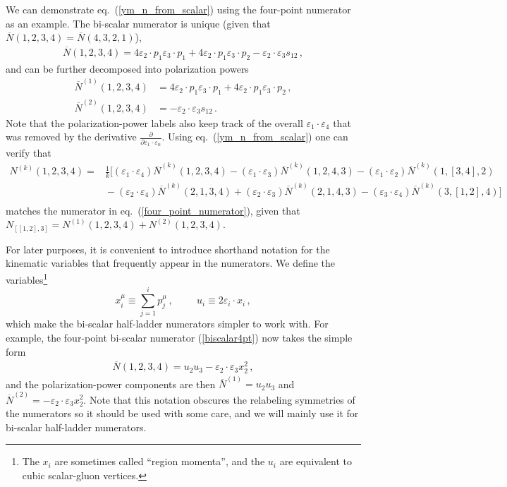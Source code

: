 \documentclass[11pt,a4paper]{article}
\newcommand{\z}{x}
\def\eqn#1{eq.~(\ref{#1})}
\begin{document}
We can demonstrate \eqn{ym_n_from_scalar} using the four-point numerator as an example. The bi-scalar numerator is unique (given that $\overline{N}(1,2,3,4)=\overline{N}(4,3,2,1)$),
%
\begin{eqnarray} \label{biscalar4pt}
\overline{N}(1,2,3,4) = 
4 \varepsilon_2{\cdot} p_1 \varepsilon_3 {\cdot} p_1 + 4 \varepsilon_2{\cdot} p_1 \varepsilon_3 {\cdot} p_2 - 
 \varepsilon_2 {\cdot} \varepsilon_3 s_{12} \, ,
\end{eqnarray}
and can be further decomposed into polarization powers
\begin{align}
\overline{N}^{(1)}(1,2,3,4) &= 
4 \varepsilon_2{\cdot} p_1 \varepsilon_3 {\cdot} p_1 + 4 \varepsilon_2{\cdot} p_1 \varepsilon_3 {\cdot} p_2  \,, \nonumber \\
 \overline{N}^{(2)}(1,2,3,4)& = - 
 \varepsilon_2 {\cdot} \varepsilon_3 s_{12} \, .
\end{align}
Note that the polarization-power labels also keep track of the overall $\varepsilon_1 {\cdot} \varepsilon_4$ that was removed by the derivative $\frac{\partial}{\partial\varepsilon_1{\cdot}\varepsilon_n}$.
Using \eqn{ym_n_from_scalar} one can verify that 
\begin{align}
    N^{(k)}(1,2,3,4)
    =& \frac{1}{k}\Big[(\varepsilon_1{\cdot}\varepsilon_4) {\overline N}^{(k)}(1,2,3,4) -(\varepsilon_1{\cdot}\varepsilon_3) {\overline N}^{(k)}(1,2,4,3)-(\varepsilon_1{\cdot}\varepsilon_2) {\overline N}^{(k)}(1,[3,4],2) \nonumber  \\
 &\!\!-(\varepsilon_2{\cdot}\varepsilon_4) {\overline N}^{(k)}(2,1,3,4)
    +(\varepsilon_2{\cdot}\varepsilon_3) {\overline N}^{(k)}(2,1,4,3)-(\varepsilon_3\cdot\varepsilon_4) {\overline N}^{(k)}(3,[1,2],4)\Big]\nonumber \\ 
\end{align}
matches the numerator in \eqn{four_point_numerator}, given that $N_{[[1,2],3]}= N^{(1)}(1,2,3,4)+N^{(2)}(1,2,3,4)$.

For later purposes, it is convenient to introduce shorthand notation for the kinematic variables that frequently appear in the numerators. We define the variables\footnote{The $x_i$ are sometimes called ``region momenta'', and the $u_i$ are equivalent to cubic scalar-gluon vertices.}
\begin{equation}
\z_i^\mu \equiv \sum_{j=1}^i p_j^\mu \, ,\hspace{1cm} u_i \equiv 2\varepsilon_i\cdot \z_i \, ,
\end{equation}
which make the bi-scalar half-ladder numerators simpler to work with. For example, the four-point bi-scalar numerator (\ref{biscalar4pt}) now takes the simple form 
\begin{eqnarray}\label{4pt_n_uz}
\overline{N}(1,2,3,4) =u_2 u_3  -\varepsilon_2\cdot\varepsilon_3 \z_2^2 \,,
\end{eqnarray}
and the polarization-power components are then $\overline{N}^{(1)} = u_2 u_3$ and $\overline{N}^{(2)} =- \varepsilon_2\cdot\varepsilon_3 \z_2^2$. Note that this notation obscures the relabeling symmetries of the numerators so it should be used with some care, and we will mainly use it for bi-scalar half-ladder numerators.   
\end{document}
